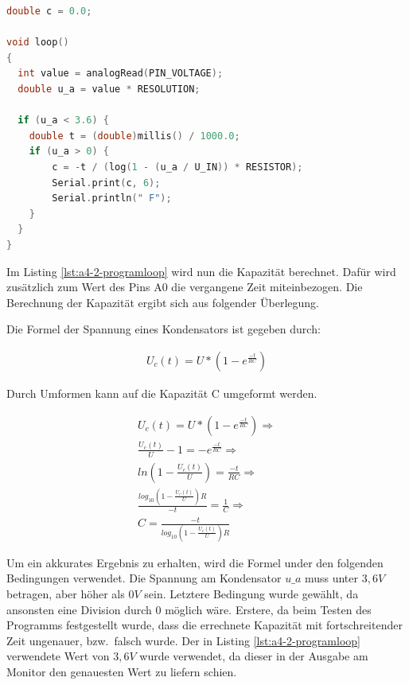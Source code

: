 \begin{lstlisting}[language=C,label={lst:a4-2-programloop}, caption={Programmschleife}]
double c = 0.0;

void loop()
{
  int value = analogRead(PIN_VOLTAGE);
  double u_a = value * RESOLUTION;

  if (u_a < 3.6) {
    double t = (double)millis() / 1000.0;
    if (u_a > 0) {
    	c = -t / (log(1 - (u_a / U_IN)) * RESISTOR);
        Serial.print(c, 6);
        Serial.println(" F");
    }
  }
}
\end{lstlisting}

Im Listing \ref{lst:a4-2-programloop} wird nun die Kapazität berechnet.
Dafür wird zusätzlich zum Wert des Pins A0 die vergangene Zeit miteinbezogen.
Die Berechnung der Kapazität ergibt sich aus folgender Überlegung.

Die Formel der Spannung eines Kondensators ist gegeben durch:

\begin{align}
    U_c(t) = U * (1 - e^{\frac{-t}{RC}})
\end{align}

Durch Umformen kann auf die Kapazität C umgeformt werden.

\begin{align}
    U_c(t) = U * (1 - e^{\frac{-t}{RC}}) \Rightarrow \\
    \frac{U_c(t)}{U} - 1 = -e^{\frac{-t}{RC}} \Rightarrow \\
    ln(1 - \frac{U_c(t)}{U}) = \frac{-t}{RC} \Rightarrow \\
    \frac{log_{10}(1 - \frac{U_c(t)}{U}) R}{-t} = \frac{1}{C} \Rightarrow \\
    C = \frac{-t}{log_{10}(1 - \frac{ U_c(t)}{U}) R}
\end{align}

Um ein akkurates Ergebnis zu erhalten, wird die Formel under den folgenden Bedingungen verwendet.
Die Spannung am Kondensator $u\_a$ muss unter $3,6V$ betragen, aber höher als $0V$ sein.
Letztere Bedingung wurde gewählt, da ansonsten eine Division durch $0$ möglich wäre.
Erstere, da beim Testen des Programms festgestellt wurde, dass die errechnete Kapazität mit fortschreitender Zeit ungenauer, bzw.\ falsch wurde.
Der in Listing \ref{lst:a4-2-programloop} verwendete Wert von $3,6V$ wurde verwendet, da dieser in der Ausgabe am Monitor den genauesten Wert zu liefern schien.

\newpage

